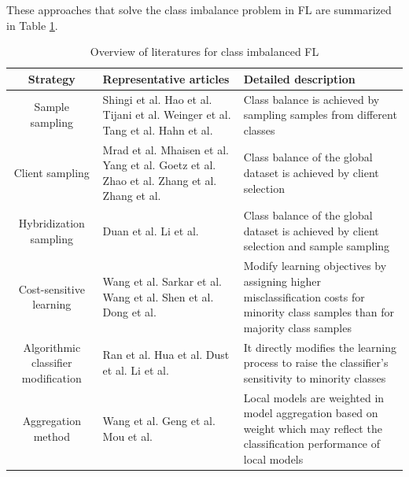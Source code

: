 \documentclass[10pt,journal,compsoc]{IEEEtran}
\begin{document}
These approaches that solve the class imbalance problem in FL are summarized in Table \ref{solving methods}.

\begin{table}[!t]
\centering
\caption{Overview of literatures for class imbalanced FL}	   
\label{solving methods}    		       	
\begin{tabular}{cp{5.5cm}p{6cm}}
	\hline
	Strategy& Representative articles&Detailed description \\ 
	\hline
	Sample sampling & Shingi et al. \cite{shingi2020federated} Hao et al. \cite{hao2021towards} Tijani et al. \cite{tijani2021federated}  Weinger et al. \cite{weinger2022enhancing} Tang et al. \cite{tangdata} Hahn et al. \cite{hahn2019privacy}& Class balance is achieved by sampling samples from different classes \\ \hline
	
	Client sampling& Mrad et al. \cite{mrad2021federated} Mhaisen et al. \cite{mhaisen2021optimal} Yang et al. \cite{yang2021federated} Goetz et al. \cite{goetz2019active} Zhao et al. \cite{zhao2020cluster} Zhang et al. \cite{zhang2021dubhe} Zhang et al. \cite{zhang2021fedsens}&Class balance of the global dataset is achieved by client selection \\ \hline
	
	Hybridization sampling&Duan et al. \cite{duan2020self} \cite{duan2019astraea} Li et al. \cite{li2021sample}&Class balance of the global dataset is achieved by client selection and sample sampling\\ \hline
	
	Cost-sensitive learning& Wang et al. \cite{wang2021addressing} Sarkar et al. \cite{sarkar2020fed} Wang et al. \cite{wang2021federated}  Shen et al. \cite{shen2021agnostic} Dong et al. \cite{dong2022federated}&Modify learning objectives by assigning higher misclassification costs for minority class samples than for majority class samples\\ \hline
	
	Algorithmic classifier modification& Ran et al. \cite{ran2021dynamic} Hua et al. \cite{hua2020blockchain} Dust et al. \cite{dust2021federated}  Li et al. \cite{li2021fedrs} & It directly modifies the learning process to raise the classifier's sensitivity to minority classes\\ \hline
	
	Aggregation method& Wang et al. \cite{wang2021adaptive} Geng et al. \cite{geng2022bearing} Mou et al.  \cite{mou2021optimized} &Local models are weighted in model aggregation based on weight which may reflect the classification performance of local models\\  \hline
	

\end{tabular}
\end{table}
\end{document}
